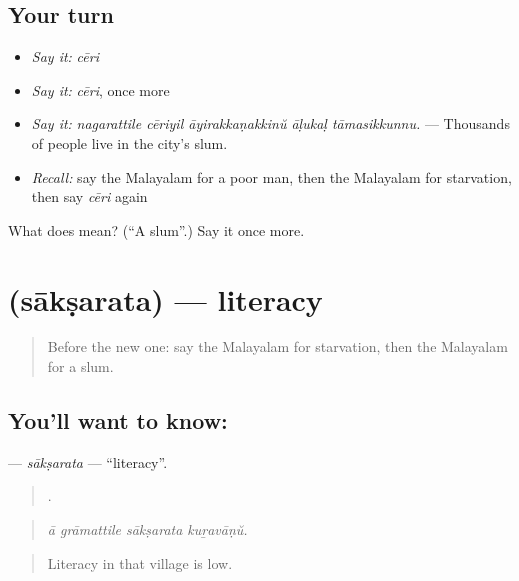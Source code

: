 \subsection*{Your turn}
\begin{itemize}
\raggedright
  \item \emph{Say it:} \emph{cēri}
  \item \emph{Say it:} \emph{cēri}, once more
  \item \emph{Say it:} \emph{nagarattile cēriyil āyirakkaṇakkinŭ āḷukaḷ tāmasikkunnu.} — Thousands of people live in the city's slum.
  \item \emph{Recall:} say the Malayalam for a poor man, then the Malayalam for starvation, then say \emph{cēri} again
\end{itemize}

\begin{tcolorbox}[breakable,colback=teal!4,colframe=teal!35!black,title={Before you move on}]
What does  mean? (\textquotedblleft{}A slum\textquotedblright{}.) Say it once more.
\end{tcolorbox}
\section[\texorpdfstring{\ml{സാക്ഷരത} (sākṣarata)}{സാക്ഷരത (sākṣarata)}]{ (sākṣarata) — literacy}

\label{lesson:ML-C427-saksarata}



\begin{quote}
Before the new one: say the Malayalam for starvation, then the Malayalam for a slum.
\end{quote}

\subsection*{You'll want to know: }
\textbf{} — \emph{sākṣarata} — \textquotedblleft{}literacy\textquotedblright{}.

\begin{quote}
   .
\end{quote}

\begin{quote}
\emph{ā grāmattile sākṣarata kuṟavāṇŭ.}
\end{quote}

\begin{quote}
Literacy in that village is low.
\end{quote}

